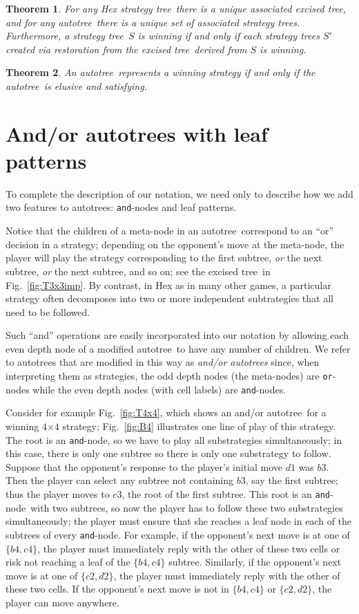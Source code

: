 \documentclass{llncs}
\def\at{autotree}
\def\stt{strategy tree}
\def\aoat{and/or autotree}
\def\exct{excised tree}
\def\myAND{\mbox{\tt and}}
\def\myOR{\mbox{\tt or}}
\def\andnode{\myAND-node}
\def\ornode{\myOR-node}
\newtheorem{theorem}{Theorem}
\newcommand{\board}[2]{\mbox{$#1$$\times$$#2$}}
\begin{document}
\begin{theorem}
For any Hex \stt\ there is a unique associated \exct,
and for any \at\ there is a unique set of associated \stt s.
Furthermore, a \stt\ $S$ is winning if and only if
each \stt s $S'$ created via restoration
from the \exct\ derived from $S$ is winning.
\end{theorem}

\begin{theorem}
An \at\ represents a winning strategy if and only if
the \at\ is elusive and satisfying.
\end{theorem}

\section{And/or \at s with leaf patterns}
To complete the description of our notation,
we need only to describe how we add two features to \at s:
\andnode s and leaf patterns.





Notice that the children of a meta-node in an \at\
correspond to an ``or'' decision in a strategy;
depending on the opponent's move at the meta-node,
the player will play the strategy
corresponding to the first subtree,
{\it or} the next subtree, {\it or} the next subtree, and so on;
see the \exct\ in Fig.~\ref{fig:T3x3imp}.
By contrast, in Hex as in many other games,
a particular strategy often decomposes into two
or more independent subtrategies that all need to be followed.

Such ``and'' operations are easily incorporated into our notation 
by allowing each even depth node of a 
modified \at\ to have any number of children.
We refer to \at s that are modified in this way as 
{\it \aoat s} since, when interpreting them as strategies,
the odd depth nodes (the meta-nodes) are \ornode s while
the even depth nodes (with cell labels) are \andnode s.

Consider for example Fig.~\ref{fig:T4x4},
which shows an \aoat\ for a winning \board{4}{4} strategy;
Fig.~\ref{fig:B4} illustrates one line of play of this strategy.
The root is an \andnode, so we have to play
all substrategies simultaneously;
in this case, there is only one subtree
so there is only one substrategy to follow.
Suppose that the opponent's response to
the player's initial move $d1$ was $b3$.
Then the player can select any subtree not containing $b3$,
say the first subtree;
thus the player moves to $c3$,
the root of the first subtree.
This root is an \andnode\ with two subtrees,
so now the player has to follow these two substrategies
simultaneously;
the player must ensure that she reaches a leaf node
in each of the subtrees of every \andnode.
For example,
if the opponent's next move is at one of $\{b4,c4\}$, 
the player must immediately reply
with the other of these two cells 
or risk not reaching a leaf of the $\{b4,c4\}$ subtree.
Similarly, if the opponent's next move is at one of $\{c2,d2\}$, 
the player must immediately reply
with the other of these two cells.
If the opponent's next move is not in $\{b4,c4\}$ or
$\{c2,d2\}$, the player can move anywhere.
\end{document}
